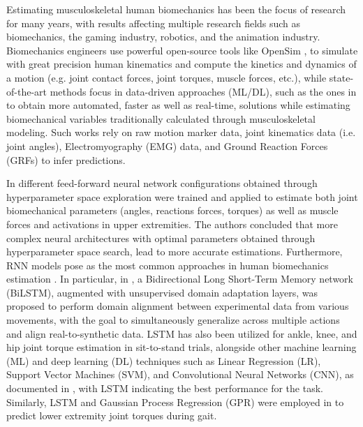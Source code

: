 Estimating musculoskeletal human biomechanics has been the focus of research for many years, with results affecting multiple research fields such as biomechanics, the gaming industry, robotics, and the animation industry. Biomechanics engineers use powerful open-source tools like OpenSim \cite{Seth2018}, to simulate with great precision human kinematics and compute the kinetics and dynamics of a motion (e.g. joint contact forces, joint torques, muscle forces, etc.), while state-of-the-art methods focus in data-driven approaches (ML/DL), such as the ones in \cite{Sharma2022, Loi2023, Wang2023, Mansour2023} to obtain more automated, faster as well as real-time, solutions while estimating biomechanical variables traditionally calculated through musculoskeletal modeling. Such works rely on raw motion marker data, joint kinematics data (i.e. joint angles), Electromyography (EMG) data, and Ground Reaction Forces (GRFs) to infer predictions. 

In \cite{Sharma2022} different feed-forward neural network configurations obtained through hyperparameter space exploration were trained and applied to estimate both joint biomechanical parameters (angles, reactions forces, torques) as well as muscle forces and activations in upper extremities. The authors concluded that more complex neural architectures with optimal parameters obtained through hyperparameter space search, lead to more accurate estimations. Furthermore, RNN models pose as the most common approaches in human biomechanics estimation \cite{Loi2023, Mansour2023, Wang2023}. %
In particular, in \cite{Loi2023}, a Bidirectional Long Short-Term Memory network (BiLSTM), augmented with unsupervised domain adaptation layers, was proposed to perform domain alignment between experimental data from various movements, with the goal to simultaneously generalize across multiple actions and align real-to-synthetic data. 
LSTM has also been utilized for ankle, knee, and hip joint torque estimation in sit-to-stand trials, alongside other machine learning (ML) and deep learning (DL) techniques such as Linear Regression (LR), Support Vector Machines (SVM), and Convolutional Neural Networks (CNN), as documented in \cite{Mansour2023}, with LSTM indicating the best performance for the task. Similarly, LSTM and Gaussian Process Regression (GPR) were employed in \cite{Wang2023} to predict lower extremity joint torques during gait. 

